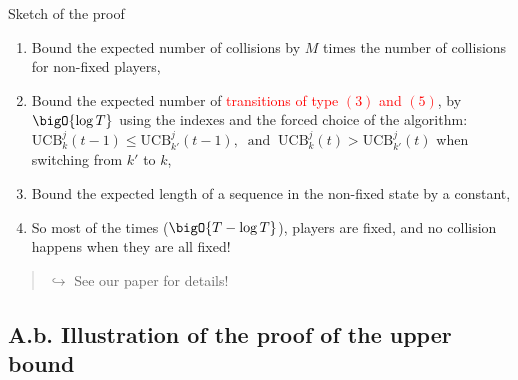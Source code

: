 \documentclass[12pt,english,ignorenonframetext,aspectratio=169,]{beamer}
\begin{document}
\begin{frame}{Sketch of the proof}

\begin{enumerate}
\def\labelenumi{\arabic{enumi}.}
\item
  Bound the expected number of collisions by \(M\) times the number of
  collisions for non-fixed players,\pause
\item
  Bound the expected number of
  \textcolor<2>{red}{transitions of type $(3)$ and $(5)$}, by
  \(\bigO{\log T}\) using the \klUCB{} indexes and the forced choice of
  the algorithm:
  \(\mathrm{UCB}_k^j(t-1) \leq \mathrm{UCB}^j_{k'}(t-1), \;\;\text{and}\;\; \mathrm{UCB}_k^j(t) > \mathrm{UCB}^j_{k'}(t)\)
  when switching from \(k'\) to \(k\),\pause
\item
  Bound the expected length of a sequence in the non-fixed state by a
  constant,\pause
\item
  So most of the times (\(\bigO{T - \log T}\)), players are fixed, and
  no collision happens when they are all fixed!
\end{enumerate}

\begin{quote}
\strut

\hfill\(\hookrightarrow\) See our paper for details!
\end{quote}

\end{frame}

\subsection{\hfill{}A.b. Illustration of the proof of the upper bound\hfill{}}
\end{document}
